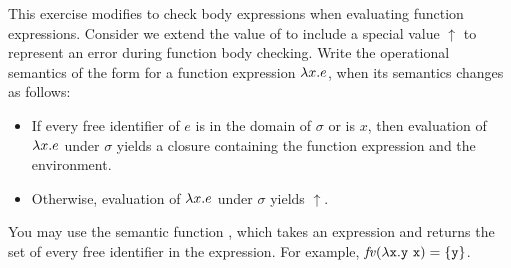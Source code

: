 \begin{exercise}

This exercise modifies \Lang to check body expressions when evaluating
function expressions.
Consider we extend the value of \Lang to include a special value $\uparrow$
to represent an error during function body checking.
Write the operational semantics of the form
 for a function expression
$\lambda x.e$, when its semantics  changes as follows:
\begin{itemize}
\item If every free identifier of $e$ is in the domain of $\sigma$ or is $x$,
  then evaluation of $\lambda x.e$ under $\sigma$ yields a closure
  containing the function expression and the environment.
\item Otherwise, evaluation of $\lambda x.e$ under $\sigma$ yields $\uparrow$.
\end{itemize}
You may use the semantic function , which takes an
expression and returns the set of every free identifier in the expression.
For example, $\mbox{\emph{fv}}(\lambda\texttt{x}.\texttt{y}\ \texttt{x}) = \{ \texttt{y} \}$.

\end{exercise}

